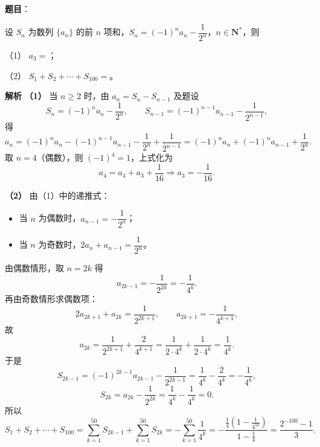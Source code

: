 \begin{answer}

\textbf{题目}：

设 $S_n$ 为数列 $\{a_n\}$ 的前 $n$ 项和，$S_n=(-1)^na_n-\dfrac1{2^n}$，$n\in\mathbf N^*$，则

（1） $a_3=$\gkblank{}；

（2） $S_1+S_2+\cdots+S_{100}=$\gkblank{}。

\textbf{解析}
\textbf{（1）} 当 $n\geqslant2$ 时，由 $a_n=S_n-S_{n-1}$ 及题设
\nopagebreak[4]
\[S_n=(-1)^na_n-\frac1{2^n},\qquad
S_{n-1}=(-1)^{n-1}a_{n-1}-\frac1{2^{n-1}},\]
得
\nopagebreak[4]
\[a_n=(-1)^na_n-(-1)^{n-1}a_{n-1}-\frac1{2^n}+\frac1{2^{n-1}}
=(-1)^na_n+(-1)^na_{n-1}+\frac1{2^n}.\]
取 $n=4$（偶数），则 $(-1)^4=1$，上式化为
\nopagebreak[4]
\[a_4=a_4+a_3+\frac1{16}\Longrightarrow a_3=-\frac1{16}.\]

\textbf{（2）} 由（1）中的递推式：
\begin{itemize}
\item 当 $n$ 为偶数时，$a_{n-1}=-\dfrac1{2^n}$；
\item 当 $n$ 为奇数时，$2a_n+a_{n-1}=\dfrac1{2^n}$。
\end{itemize}

由偶数情形，取 $n=2k$ 得
\nopagebreak[4]
\[a_{2k-1}=-\frac1{2^{2k}}=-\frac1{4^k}.\]
再由奇数情形求偶数项：
\nopagebreak[4]
\[2a_{2k+1}+a_{2k}=\frac1{2^{2k+1}},\qquad
a_{2k+1}=-\frac1{4^{k+1}},\]
故
\nopagebreak[4]
\[a_{2k}=\frac1{2^{2k+1}}+\frac2{4^{k+1}}
=\frac1{2\cdot4^k}+\frac1{2\cdot4^k}=\frac1{4^k}.\]
于是
\nopagebreak[4]
\[S_{2k-1}=(-1)^{2k-1}a_{2k-1}-\frac1{2^{2k-1}}
=\frac1{4^k}-\frac2{4^k}=-\frac1{4^k},\]
\nopagebreak[4]
\[S_{2k}=a_{2k}-\frac1{2^{2k}}=\frac1{4^k}-\frac1{4^k}=0.\]
所以
\nopagebreak[4]
\[S_1+S_2+\cdots+S_{100}
=\sum_{k=1}^{50}S_{2k-1}+\sum_{k=1}^{50}S_{2k}
=-\sum_{k=1}^{50}\frac1{4^k}
=-\frac{\frac14\left(1-\frac1{4^{50}}\right)}{1-\frac14}
=\frac{2^{-100}-1}{3}.\]



\end{answer}
